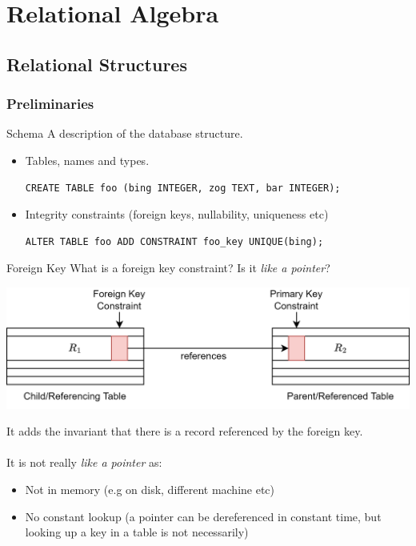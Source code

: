 \chapter{Relational Algebra}

\section{Relational Structures}

\subsection{Preliminaries}
\begin{definitionbox}{Schema}
    A description of the database structure.
    \begin{itemize}
        \item {Tables, names and types.
            \begin{verbatim}
CREATE TABLE foo (bing INTEGER, zog TEXT, bar INTEGER); 
            \end{verbatim}
        }
        \item {Integrity constraints (foreign keys, nullability, uniqueness etc)
                \begin{verbatim}
ALTER TABLE foo ADD CONSTRAINT foo_key UNIQUE(bing);
                \end{verbatim}
        }
    \end{itemize}
\end{definitionbox}

\begin{examplebox}{Foreign Key}
  What is a foreign key constraint? Is it \textit{like a pointer}?
  \tcblower
  \begin{center}
    \includegraphics[width=.7\textwidth]{relational_algebra/images/example_answer_foreign_key.drawio.png}
  \end{center}
  It adds the invariant that there is a record referenced by the foreign key.
  \\
  \\ It is not really \textit{like a pointer} as:
  \begin{itemize}
    \item Not in memory (e.g on disk, different machine etc)
    \item No constant lookup (a pointer can be dereferenced in constant time, but looking up a key in a table is not necessarily)
  \end{itemize}
\end{examplebox}

